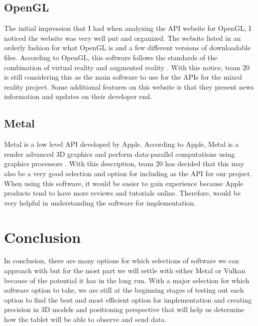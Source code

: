 \documentclass[a4paper, 11pt]{article} %
\begin{document}
\subsection{OpenGL}
	The initial impression that I had when analyzing the API website for OpenGL, I noticed the website was very well put and organized. The website listed in an orderly fashion for what OpenGL is and a few different versions of downloadable files. According to OpenGL, this software follows the standards of the combination of virtual reality and augmented reality \cite{OpenGL:2018}. With this notice, team 20 is still considering this as the main software to use for the APIs for the mixed reality project. Some additional features on this website is that they present news information and updates on their developer end.



\subsection{Metal}
	Metal is a low level API developed by Apple. According to Apple, Metal is a render advanced 3D graphics and perform data-parallel computations using graphics processors \cite{Metal:2018}. With this description, team 20 has decided that this may also be a very good selection and option for including as the API for our project. When using this software, it would be easier to gain experience because Apple products tend to have more reviews and tutorials online. Therefore, would be very helpful in understanding the software for implementation.








\section{Conclusion}
	In conclusion, there are many options for which selections of software we can approach with but for the most part we will settle with either Metal or Vulkan because of the potential it has in the long run. With a major selection for which software option to take, we are still at the beginning stages of testing out each option to find the best and most efficient option for implementation and creating precision in 3D models and positioning perspective that will help us determine how the tablet will be able to observe and send data.

\newpage





\end{document}
